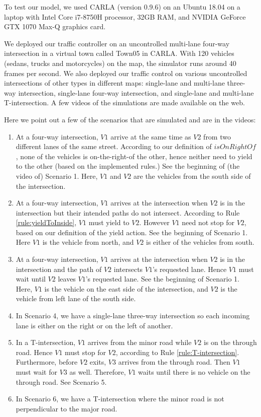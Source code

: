To test our model,
we used CARLA (version 0.9.6) on an Ubuntu 18.04 on
a laptop with Intel Core i7-8750H processor,
32GB RAM, and 
NVIDIA GeForce GTX 1070 Max-Q graphics card.

We deployed our traffic controller on
an uncontrolled multi-lane four-way intersection in a virtual town called Town05 in CARLA.
With 120 vehicles (sedans, trucks and motorcycles) on the map,
the simulator runs around 40 frames per second.
We also deployed our traffic control on
various uncontrolled intersections of other types in different maps:
single-lane and multi-lane three-way intersection,
single-lane four-way intersection, and
single-lane and multi-lane T-intersection.
A few videos of the simulations are made available on the web.\footnotemark[\ref{foot:link}]

Here we point out a few of the scenarios that are simulated and are in the videos:

\begin{enumerate}
    \item 
    At a four-way intersection,
    $V1$ arrive at the same time as $V2$ from two different lanes of the same street.
    According to our definition of $isOnRightOf$,
    none of the vehicles is on-the-right-of the other,
    hence neither need to yield to the other
    (based on the implemented rules.)
    See the beginning of (the video of) Scenario 1.
    Here,
    $V1$ and $V2$ are the vehicles from the south side of the intersection.
    \item
    At a four-way intersection,
    $V1$ arrives at the intersection when $V2$ is in the intersection
    but their intended paths do not intersect.
    According to Rule \ref{rule:yieldToInside},
    $V1$ must yield to $V2$.
    However $V1$ need not stop for $V2$,
    based on our definition of the yield action.
    See the beginning of Scenario 1.
    Here $V1$ is the vehicle from north, and
    $V2$ is either of the vehicles from south.
    \item
    At a four-way intersection,
    $V1$ arrives at the intersection when $V2$ is in the intersection
    and the path of $V2$ intersects $V1$'s requested lane.
    Hence $V1$ must wait until $V2$ leaves $V1$'s requested lane.
    See the beginning of Scenario 1.
    Here,
    $V1$ is the vehicle on the east side of the intersection, and
    $V2$ is the vehicle from left lane of the south side.
    \item
    In Scenario 4,
    we have a single-lane three-way intersection
    so each incoming lane is either on the right or on the left of another.
    \item
    In a T-intersection,
    $V1$ arrives from the minor road while $V2$ is on the through road.
    Hence $V1$ must stop for $V2$,
    according to Rule \ref{rule:T-intersection}.
    Furthermore,
    before $V2$ exits,
    $V3$ arrives from the through road.
    Then $V1$ must wait for $V3$ as well.
    Therefore,
    $V1$ waits until there is no vehicle on the through road.
    See Scenario 5.
    \item
    In Scenario 6,
    we have a T-intersection where
    the minor road is not perpendicular to the major road.
\end{enumerate}


